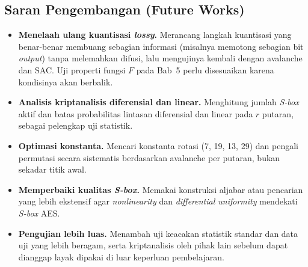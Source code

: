 \subsection{Saran Pengembangan (Future Works)}
\begin{itemize}
  \item \textbf{Menelaah ulang kuantisasi \textit{lossy}.} Merancang langkah kuantisasi yang benar-benar
    membuang sebagian informasi (misalnya memotong sebagian bit \textit{output}) tanpa melemahkan
    difusi, lalu mengujinya kembali dengan avalanche dan SAC. Uji properti fungsi $F$
    pada Bab~5 perlu disesuaikan karena kondisinya akan berbalik.
  \item \textbf{Analisis kriptanalisis diferensial dan linear.} Menghitung jumlah \textit{S-box}
    aktif dan batas probabilitas lintasan diferensial dan linear pada $r$ putaran, sebagai
    pelengkap uji statistik.
  \item \textbf{Optimasi konstanta.} Mencari konstanta rotasi (7, 19, 13, 29) dan pengali permutasi
    secara sistematis berdasarkan avalanche per putaran, bukan sekadar titik awal.
  \item \textbf{Memperbaiki kualitas \textit{S-box}.} Memakai konstruksi aljabar atau pencarian
    yang lebih ekstensif agar \textit{nonlinearity} dan \textit{differential uniformity} mendekati
    \textit{S-box} AES.
  \item \textbf{Pengujian lebih luas.} Menambah uji keacakan statistik standar dan data uji yang lebih
    beragam, serta kriptanalisis oleh pihak lain sebelum \algname{} dapat dianggap layak dipakai di
    luar keperluan pembelajaran.
\end{itemize}
